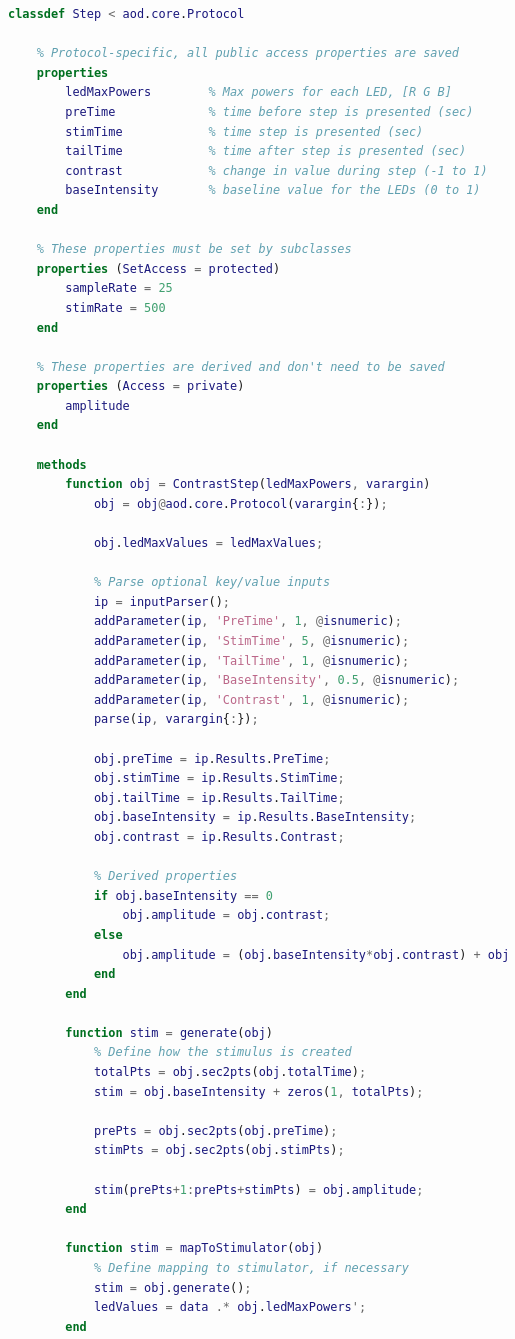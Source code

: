 \documentclass[10pt]{exam}
\begin{document}
		\begin{lstlisting}[language=matlab]
classdef Step < aod.core.Protocol
	
	% Protocol-specific, all public access properties are saved
	properties
		ledMaxPowers        % Max powers for each LED, [R G B]
		preTime             % time before step is presented (sec)
		stimTime            % time step is presented (sec)
		tailTime            % time after step is presented (sec)
		contrast            % change in value during step (-1 to 1)
		baseIntensity       % baseline value for the LEDs (0 to 1)
	end
	
	% These properties must be set by subclasses
	properties (SetAccess = protected)
		sampleRate = 25
		stimRate = 500
	end
	
	% These properties are derived and don't need to be saved
	properties (Access = private)
		amplitude
	end
	
	methods
		function obj = ContrastStep(ledMaxPowers, varargin)
			obj = obj@aod.core.Protocol(varargin{:});
			
			obj.ledMaxValues = ledMaxValues;
			
			% Parse optional key/value inputs
			ip = inputParser();
			addParameter(ip, 'PreTime', 1, @isnumeric);
			addParameter(ip, 'StimTime', 5, @isnumeric);
			addParameter(ip, 'TailTime', 1, @isnumeric);
			addParameter(ip, 'BaseIntensity', 0.5, @isnumeric);
			addParameter(ip, 'Contrast', 1, @isnumeric);
			parse(ip, varargin{:});
			
			obj.preTime = ip.Results.PreTime;
			obj.stimTime = ip.Results.StimTime;
			obj.tailTime = ip.Results.TailTime;
			obj.baseIntensity = ip.Results.BaseIntensity;
			obj.contrast = ip.Results.Contrast;

			% Derived properties
			if obj.baseIntensity == 0
				obj.amplitude = obj.contrast;
			else 
				obj.amplitude = (obj.baseIntensity*obj.contrast) + obj.baseIntensity;
			end
		end
		
		function stim = generate(obj)
			% Define how the stimulus is created
			totalPts = obj.sec2pts(obj.totalTime);
			stim = obj.baseIntensity + zeros(1, totalPts);
			
			prePts = obj.sec2pts(obj.preTime);
			stimPts = obj.sec2pts(obj.stimPts);
			
			stim(prePts+1:prePts+stimPts) = obj.amplitude;
		end
		
		function stim = mapToStimulator(obj)
			% Define mapping to stimulator, if necessary
			stim = obj.generate();
			ledValues = data .* obj.ledMaxPowers';
		end


\end{lstlisting}
\end{document}
